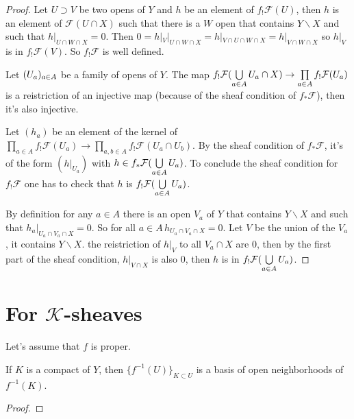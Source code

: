 \begin{proof}
    Let $U\supset V$ be two opens of $Y$ and $h$ be an element of $f_!\mathcal{F}(U)$, then $h$ is an element of $\mathcal{F}(U\cap X)$ such that there is a $W$ open that contains $Y\backslash X$ and such that $h|_{U\cap W\cap X}=0$. Then  $0=h|_V|_{U\cap W\cap X}=h|_{V\cap U\cap W\cap X}=h|_{V\cap W\cap X}$ so $h|_V$ is in $f_!\mathcal{F}(V)$. So $f_!\mathcal{F}$ is well defined.

    Let $(U_a)_{a\in A}$ be a family of opens of $Y$. The map $f_!\mathcal{F}(\bigcup\limits_{a\in A}U_a\cap X)\to\prod\limits_{a\in A}f_!\mathcal{F}(U_a)$ is a reistriction of an injective map (because of the sheaf condition of $f_*\mathcal{F}$), then it's also injective.

    Let $(h_a)$ be an element of the kernel of $\prod\limits_{a\in A}f_!\mathcal{F}(U_a)\to \prod\limits_{a,b\in A}f_!\mathcal{F}(U_a\cap U_b)$. By the sheaf condition of $f_*\mathcal{F}$, it's of the form $(h|_{U_a})$ with $h\in f_*\mathcal{F}(\bigcup\limits_{a\in A}U_a)$. To conclude the sheaf condition for $f_!\mathcal{F}$ one has to check that $h$ is $f_!\mathcal{F}(\bigcup\limits_{a\in A}U_a)$.

    By definition for any $a\in A$ there is an open $V_a$ of $Y$ that contains $Y\backslash X$ and such that $h_a|_{U_a\cap V_a\cap X}=0$. So for all $a\in A\, h_{U_a\cap V_a\cap X}=0$. Let $V$ be the union of the $V_a$, it contains $Y\backslash X$. the reistriction of $h|_V$ to all $V_a\cap X$ are $0$, then by the first part of the sheaf condition, $h|_{V\cap X}$ is also $0$, then $h$ is in $f_!\mathcal{F}(\bigcup\limits_{a\in A}U_a)$.    
    
\end{proof}

\section{For $\mathcal{K}$-sheaves}

Let's assume that $f$ is proper.

\begin{lemma}\label{lem:basis_of_open_of_fm1K}
    If $K$ is a compact of $Y$, then $\{f^{-1}(U)\}_{K\subset U}$ is a basis of open neighborhoods of $f^{-1}(K)$.
\end{lemma}

\begin{proof}

\end{proof}

